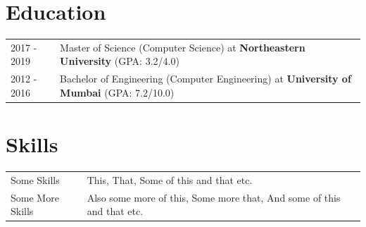 \documentclass[a4paper,11pt]{article}
\begin{document}
\section{Education}
\begin{tabularx}{\linewidth}{@{}l X@{}}
	2017 - 2019 & Master of Science (Computer Science) at \textbf{Northeastern University} \hfill \normalsize (GPA: 3.2/4.0) \\

	2012 - 2016 & Bachelor of Engineering (Computer Engineering) at \textbf{University of Mumbai} \hfill (GPA: 7.2/10.0)     \\
\end{tabularx}


\section{Skills}
\begin{tabularx}{\linewidth}{@{}l X@{}}
	Some Skills      & \normalsize{This, That, Some of this and that etc.}                                 \\
	Some More Skills & \normalsize{Also some more of this, Some more that, And some of this and that etc.} \\
\end{tabularx}

\vfill
{}
\end{document}
